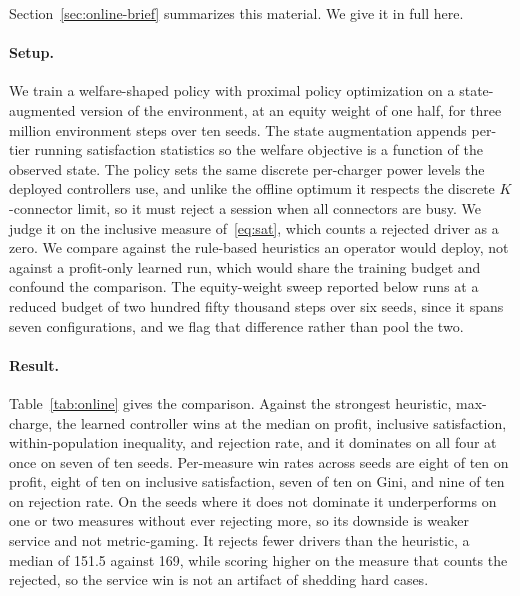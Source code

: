 \documentclass[manuscript, screen, review, anonymous]{acmart}
\begin{document}
Section~\ref{sec:online-brief} summarizes this material. We give it in full here.

\paragraph{Setup.}
We train a welfare-shaped policy with proximal policy optimization on a state-augmented version of the environment, at an equity weight of one half, for three million environment steps over ten seeds. The state augmentation appends per-tier running satisfaction statistics so the welfare objective is a function of the observed state. The policy sets the same discrete per-charger power levels the deployed controllers use, and unlike the offline optimum it respects the discrete $K$-connector limit, so it must reject a session when all connectors are busy. We judge it on the inclusive measure of~\eqref{eq:sat}, which counts a rejected driver as a zero. We compare against the rule-based heuristics an operator would deploy, not against a profit-only learned run, which would share the training budget and confound the comparison. The equity-weight sweep reported below runs at a reduced budget of two hundred fifty thousand steps over six seeds, since it spans seven configurations, and we flag that difference rather than pool the two.

\paragraph{Result.}
Table~\ref{tab:online} gives the comparison. Against the strongest heuristic, max-charge, the learned controller wins at the median on profit, inclusive satisfaction, within-population inequality, and rejection rate, and it dominates on all four at once on seven of ten seeds. Per-measure win rates across seeds are eight of ten on profit, eight of ten on inclusive satisfaction, seven of ten on Gini, and nine of ten on rejection rate. On the seeds where it does not dominate it underperforms on one or two measures without ever rejecting more, so its downside is weaker service and not metric-gaming. It rejects fewer drivers than the heuristic, a median of 151.5 against 169, while scoring higher on the measure that counts the rejected, so the service win is not an artifact of shedding hard cases.
\end{document}
